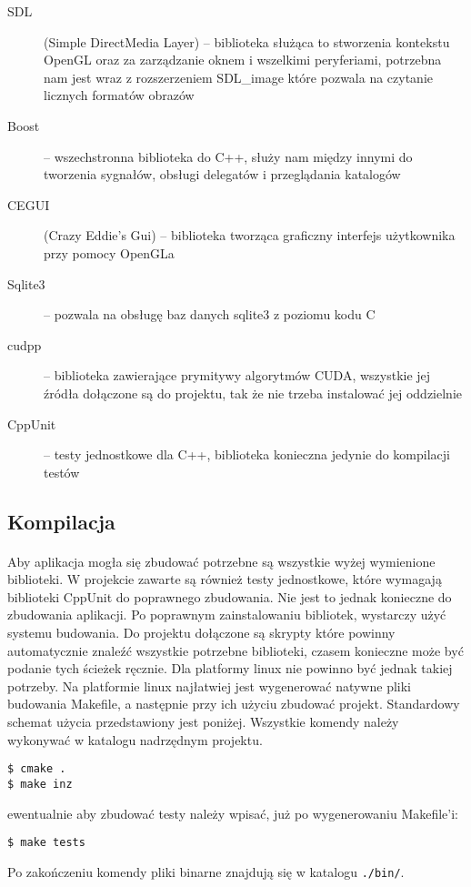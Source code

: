 \begin{description}
\item[SDL] (Simple DirectMedia Layer) -- biblioteka służąca to stworzenia kontekstu OpenGL oraz za zarządzanie oknem i wszelkimi peryferiami, potrzebna nam jest wraz z rozszerzeniem SDL\_image które pozwala na czytanie licznych formatów obrazów
\item[Boost] -- wszechstronna biblioteka do C++, służy nam między innymi do tworzenia sygnałów, obsługi delegatów i przeglądania katalogów
\item[CEGUI] (Crazy Eddie's Gui) -- biblioteka tworząca graficzny interfejs użytkownika przy pomocy OpenGLa
\item[Sqlite3] -- pozwala na obsługę baz danych sqlite3 z poziomu kodu C
\item[cudpp] -- biblioteka zawierające prymitywy algorytmów CUDA, wszystkie jej źródła dołączone są do projektu, tak że nie trzeba instalować jej oddzielnie
\item[CppUnit] -- testy jednostkowe dla C++, biblioteka konieczna jedynie do kompilacji testów
\end{description}

\subsection{Kompilacja}\label{sub:kompilacja}
\paragraph{}

Aby aplikacja mogła się zbudować potrzebne są wszystkie wyżej wymienione biblioteki. W projekcie zawarte są również testy jednostkowe, które wymagają biblioteki CppUnit do poprawnego zbudowania. Nie jest to jednak konieczne do zbudowania aplikacji. Po poprawnym zainstalowaniu bibliotek, wystarczy użyć systemu budowania. Do projektu dołączone są skrypty które powinny automatycznie znaleźć wszystkie potrzebne biblioteki, czasem konieczne może być podanie tych ścieżek ręcznie. Dla platformy linux nie powinno być jednak takiej potrzeby. Na platformie linux najłatwiej jest wygenerować natywne pliki budowania Makefile, a następnie przy ich użyciu zbudować projekt. Standardowy schemat użycia przedstawiony jest poniżej. Wszystkie komendy należy wykonywać w katalogu nadrzędnym projektu.

\begin{verbatim}
$ cmake .
$ make inz
\end{verbatim}

ewentualnie aby zbudować testy należy wpisać, już po wygenerowaniu Makefile'i:

\begin{verbatim}
$ make tests
\end{verbatim}

Po zakończeniu komendy pliki binarne znajdują się w katalogu \texttt{./bin/}.

